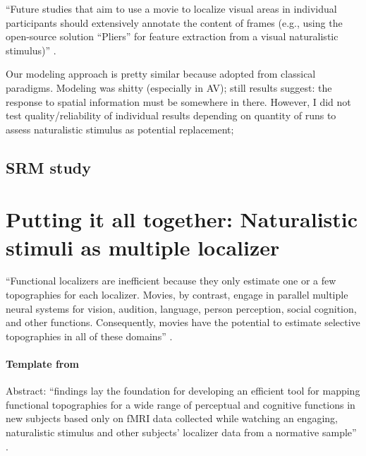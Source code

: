 


%
``Future studies that aim to use a movie to localize visual areas in individual
participants should extensively annotate the content of frames (e.g., using the
open-source solution ``Pliers''\citep{mcnamara2017developing} for feature
extraction from a visual naturalistic stimulus)''
\citep{haeusler2022processing}.

%
Our modeling approach is pretty similar because adopted from classical
paradigms.
%
Modeling was shitty (especially in AV);
%
still results suggest: the response to spatial information must be somewhere in
there.
%
However, I did not test quality/reliability of individual results depending on
quantity of runs to assess naturalistic stimulus as potential replacement;


\subsection{SRM study}



\section{Putting it all together: Naturalistic stimuli as multiple localizer}


%
``Functional localizers are inefficient because they only estimate one or a few
topographies for each localizer.
%
Movies, by contrast, engage in parallel multiple neural systems for vision,
audition, language, person perception, social cognition, and other functions.
%
Consequently, movies have the potential to estimate selective topographies in
all of these domains'' \citep{jiahui2020predicting}.


\paragraph{Template from \citet{jiahui2020predicting}}

%
Abstract: ``findings lay the foundation for developing an efficient tool
for mapping functional topographies for a wide range of perceptual and cognitive
functions in new subjects based only on fMRI data collected while watching an
engaging, naturalistic stimulus and other subjects' localizer data from a
normative sample'' \citep{jiahui2020predicting}.

